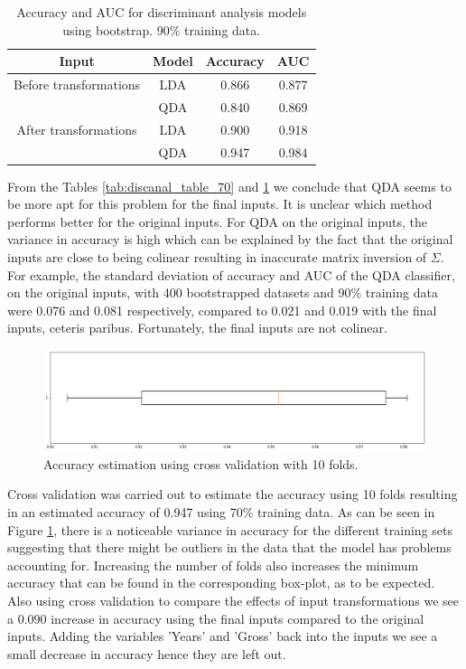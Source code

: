 \documentclass[../../project.tex]{subfiles}
\begin{document}
		\begin{table}[h!]
		\centering
			\caption{Accuracy and AUC for discriminant analysis models using bootstrap. 90\% training data.}
		\begin{tabular}{cccc}
		    \toprule
			Input & Model & Accuracy & AUC \\
			\midrule
			Before transformations
			& LDA & 0.866 & 0.877 \\
		    & QDA & 0.840 & 0.869 \\
			\midrule
			After transformations
			& LDA & 0.900 & 0.918 \\
			& QDA & 0.947 & 0.984 \\
			\bottomrule
		\end{tabular}
		\label{tab:discanal_table_90}
	\end{table}
	From the Tables \ref{tab:discanal_table_70} and \ref{tab:discanal_table_90} we conclude that QDA seems to be more apt for this problem for the final inputs. It is unclear which method performs better for the original inputs. For QDA on the original inputs, the variance in accuracy is high which can be explained by the fact that the original inputs are close to being colinear resulting in inaccurate matrix inversion of $\Sigma$. For example, the standard deviation of accuracy and AUC of the QDA classifier, on the original inputs, with 400 bootstrapped datasets and 90\% training data were 0.076 and 0.081 respectively, compared to 0.021 and 0.019 with the final inputs, ceteris paribus. Fortunately, the final inputs are not colinear.
	
	\begin{figure}[ht]
		\centering
    	\includegraphics[width=1\linewidth]{project/tex/QDAboxplot.png}
		\caption{Accuracy estimation using cross validation with 10 folds.}
		\label{fig:boxplotQDA}
    \end{figure}
	
	Cross validation was carried out to estimate the accuracy using 10 folds resulting in an estimated accuracy of 0.947 using 70\% training data. As can be seen in Figure \ref{fig:boxplotQDA}, there is a noticeable variance in accuracy for the different training sets suggesting that there might be outliers in the data that the model has problems accounting for. Increasing the number of folds also increases the minimum accuracy that can be found in the corresponding box-plot, as to be expected. Also using cross validation to compare the effects of input transformations we see a 0.090 increase in accuracy using the final inputs compared to the original inputs. Adding the variables 'Years' and 'Gross' back into the inputs we see a small decrease in accuracy hence they are left out.
\end{document}
